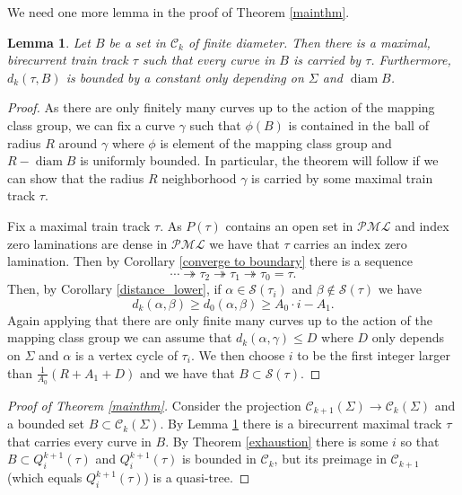 \documentclass[11pt]{article}
\newtheorem{lemma}[thm]{Lemma}
\theoremstyle{remark}
\def\S{{\mathcal S}}
\def\diam{\operatorname{diam}}
\def\PML{{\mathcal{PML}}}
\def\C{{\mathcal C}}
\begin{document}
We need one more lemma in the proof of Theorem \ref{mainthm}.


\begin{lemma}\label{tau}
  Let $B$ be a set in $\C_k$ of finite diameter. Then there is a
  maximal, birecurrent train track $\tau$ such that every curve in $B$
  is carried by $\tau$. Furthermore, $d_k(\tau, B)$ is bounded by a
  constant only depending on $\Sigma$ and  $\diam B$.
\end{lemma}

\begin{proof}
As there are only finitely many curves up to the action of the mapping class group, we can fix a curve $\gamma$ such that $\phi(B)$ is contained in the ball of radius $R$ around $\gamma$ where $\phi$ is element of the mapping class group and $R- \diam B$ is uniformly bounded. In particular, the theorem will follow if we can show that the radius $R$ neighborhood $\gamma$ is carried by some maximal train track $\tau$.


  Fix a maximal train track $\tau$. As $P(\tau)$ contains an open set in $\PML$ and index zero laminations are dense in $\PML$ we have that $\tau$ carries an index zero lamination. Then by Corollary \ref{converge to boundary} there is a sequence
  $$\cdots \twoheadrightarrow \tau_2 \twoheadrightarrow \tau_1 \twoheadrightarrow \tau_0 = \tau.$$
  Then, by Corollary \ref{distance_lower}, if $\alpha \in \S(\tau_i)$ and $\beta\not\in\S(\tau)$ we have
  $$d_k(\alpha, \beta) \ge d_0(\alpha, \beta)\ge A_0\cdot i - A_1.$$
  Again applying that there are only finite many curves up to the action of the mapping class group we can assume that $d_k(\alpha, \gamma)\le D$ where $D$ only depends on $\Sigma$ and $\alpha$ is a vertex cycle of $\tau_i$. We then choose $i$ to be the first integer larger than $\frac1{A_0}\left(R+A_1 +D\right)$ and we have that $B \subset \S(\tau)$.
\end{proof}  

\begin{proof}[Proof of Theorem \ref{mainthm}]
  Consider the projection $\C_{k+1}(\Sigma)\to\C_{k}(\Sigma)$ and a
  bounded set $B\subset \C_{k}(\Sigma)$. By Lemma \ref{tau} there is
  a birecurrent maximal track $\tau$ that carries every curve in
  $B$. By Theorem \ref{exhaustion} there is some $i$ so that $B\subset
  Q^{k+1}_i(\tau)$ and $Q^{k+1}_i(\tau)$ is bounded in $\C_k$, but its
  preimage in $\C_{k+1}$ (which equals $Q^{k+1}_i(\tau)$) is a
  quasi-tree.
\end{proof}
\end{document}
